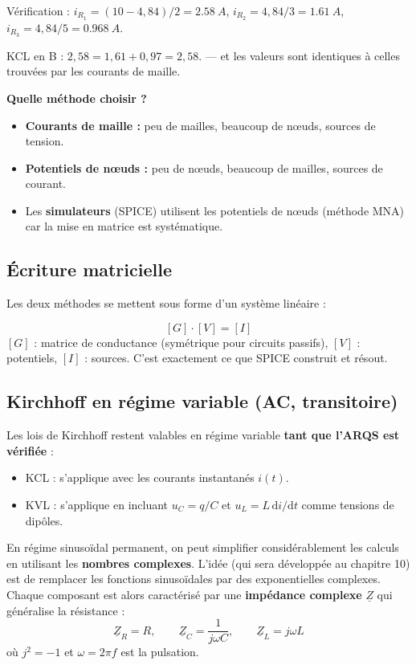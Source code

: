 \documentclass[12pt,a4paper,twoside]{book}
\begin{document}
Vérification : $i_{R_1} = (10-4{,}84)/2 = \SI{2.58}{A}$, $i_{R_2} = 4{,}84/3 = \SI{1.61}{A}$, $i_{R_3} = 4{,}84/5 = \SI{0.968}{A}$.

KCL en B : $2{,}58 = 1{,}61 + 0{,}97 = 2{,}58$. \checkmark{} --- et les valeurs sont identiques à celles trouvées par les courants de maille.

\begin{pratique}
\textbf{Quelle méthode choisir ?}
\begin{itemize}[nosep]
\item \textbf{Courants de maille :} peu de mailles, beaucoup de n\oe uds, sources de tension.
\item \textbf{Potentiels de n\oe uds :} peu de n\oe uds, beaucoup de mailles, sources de courant.
\item Les \textbf{simulateurs} (SPICE) utilisent les potentiels de n\oe uds (méthode MNA) car la mise en matrice est systématique.
\end{itemize}
\end{pratique}

\subsection{Écriture matricielle}

Les deux méthodes se mettent sous forme d'un système linéaire :
\begin{formule}
\[
\boxed{[G] \cdot [V] = [I]}
\]
$[G]$ : matrice de conductance (symétrique pour circuits passifs), $[V]$ : potentiels, $[I]$ : sources. C'est exactement ce que SPICE construit et résout.
\end{formule}

\subsection{Kirchhoff en régime variable (AC, transitoire)}

Les lois de Kirchhoff restent valables en régime variable \textbf{tant que l'ARQS est vérifiée} :
\begin{itemize}[nosep]
\item KCL : s'applique avec les courants instantanés $i(t)$.
\item KVL : s'applique en incluant $u_C = q/C$ et $u_L = L\,\mathrm{d}i/\mathrm{d}t$ comme tensions de dipôles.
\end{itemize}

En régime sinusoïdal permanent, on peut simplifier considérablement les calculs en utilisant les \textbf{nombres complexes}. L'idée (qui sera développée au chapitre 10) est de remplacer les fonctions sinusoïdales par des exponentielles complexes. Chaque composant est alors caractérisé par une \textbf{impédance complexe} $\underline{Z}$ qui généralise la résistance :
\[
\underline{Z}_R = R, \qquad \underline{Z}_C = \frac{1}{j\omega C}, \qquad \underline{Z}_L = j\omega L
\]
où $j^2 = -1$ et $\omega = 2\pi f$ est la pulsation.
\end{document}
